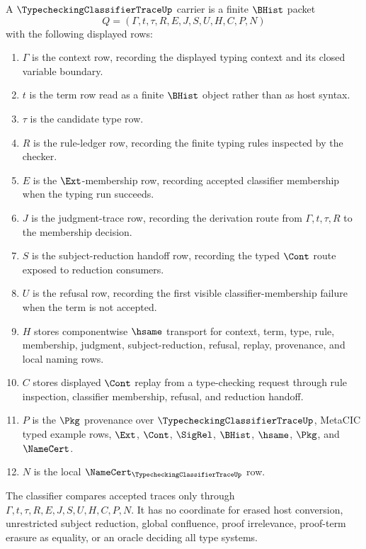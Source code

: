 \begin{definition}
\label{def:typechecking-classifier-trace-carrier}
A $\TypecheckingClassifierTraceUp$ carrier is a finite $\BHist$ packet
$$
Q=(\Gamma,t,\tau,R,E,J,S,U,H,C,P,N)
$$
with the following displayed rows:
\begin{enumerate}
\item $\Gamma$ is the context row, recording the displayed typing context and its closed variable boundary.
\item $t$ is the term row read as a finite $\BHist$ object rather than as host syntax.
\item $\tau$ is the candidate type row.
\item $R$ is the rule-ledger row, recording the finite typing rules inspected by the checker.
\item $E$ is the $\Ext$-membership row, recording accepted classifier membership when the typing run succeeds.
\item $J$ is the judgment-trace row, recording the derivation route from $\Gamma,t,\tau,R$ to the membership decision.
\item $S$ is the subject-reduction handoff row, recording the typed $\Cont$ route exposed to reduction consumers.
\item $U$ is the refusal row, recording the first visible classifier-membership failure when the term is not accepted.
\item $H$ stores componentwise $\hsame$ transport for context, term, type, rule, membership, judgment, subject-reduction, refusal, replay, provenance, and local naming rows.
\item $C$ stores displayed $\Cont$ replay from a type-checking request through rule inspection, classifier membership, refusal, and reduction handoff.
\item $P$ is the $\Pkg$ provenance over $\TypecheckingClassifierTraceUp$, MetaCIC typed example rows, $\Ext$, $\Cont$, $\SigRel$, $\BHist$, $\hsame$, $\Pkg$, and $\NameCert$.
\item $N$ is the local $\NameCert_{\TypecheckingClassifierTraceUp}$ row.
\end{enumerate}
The classifier compares accepted traces only through $\Gamma,t,\tau,R,E,J,S,U,H,C,P,N$. It has no coordinate for erased host conversion, unrestricted subject reduction, global confluence, proof irrelevance, proof-term erasure as equality, or an oracle deciding all type systems.
\end{definition}

